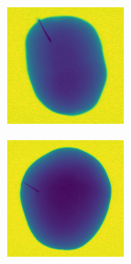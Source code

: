 \documentclass[11pt]{article}
\begin{document}
\begin{figure}[!h]
\begin{subfigure}[b]{0.22\textwidth}
         \caption{}
         \label{fig:metal_35}
     \end{subfigure}
               \\
    \begin{subfigure}[b]{0.22\textwidth}
         \centering
         \includegraphics[width=\textwidth]{figurer/potato_dataset/metal/metal_36.jpg}
         \caption{}
         \label{fig:metal_36}
     \end{subfigure}
     \hfill
     \begin{subfigure}[b]{0.22\textwidth}
         \centering
         \includegraphics[width=\textwidth]{figurer/potato_dataset/metal/metal_37.jpg}

\end{subfigure}
\end{figure}
\end{document}
